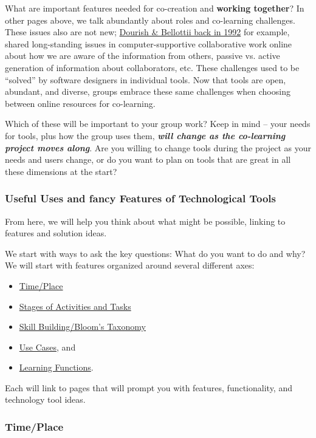 What are important features needed for co-creation and \textbf{working
together}? In other pages above, we talk abundantly about roles and
co-learning challenges. These issues also are not new;
\hyperref[dourish]{Dourish \& Bellottii back in 1992} for example,
shared long-standing issues in computer-supportive collaborative work
online about how we are aware of the information from others, passive
vs. active generation of information about collaborators, etc. These
challenges used to be ``solved'' by software designers in individual
tools. Now that tools are open, abundant, and diverse, groups embrace
these same challenges when choosing between online resources for
co-learning.

Which of these will be important to your group work? Keep in mind --
your needs for tools, plus how the group uses them, \emph{\textbf{will
change as the co-learning project moves along}}. Are you willing to
change tools during the project as your needs and users change, or do
you want to plan on tools that are great in all these dimensions at the
start?

\subsubsection{Useful Uses and fancy Features of Technological Tools}

From here, we will help you think about what might be possible, linking
to features and solution ideas.

We start with ways to ask the key questions: What do you want to do and
why? We will start with features organized around several different
axes:

\begin{itemize}
\item
  \hyperref[time-place]{Time/Place}
\item
  \hyperref[stages]{Stages of Activities and Tasks}
\item
  \hyperref[skill]{Skill Building/Bloom's Taxonomy}
\item
  \hyperref[use]{Use Cases}, and
\item
  \hyperref[functions]{Learning Functions}.
\end{itemize}

Each will link to pages that will prompt you with features,
functionality, and technology tool ideas.

\subsubsection{Time/Place}

